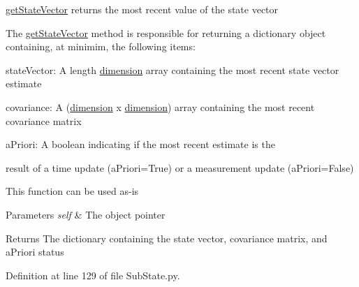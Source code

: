 \hyperlink{classmodest_1_1substates_1_1SubState_1_1SubState_a26146efb15c1d33fee433df4725bae45}{get\+State\+Vector} returns the most recent value of the state vector 

The \hyperlink{classmodest_1_1substates_1_1SubState_1_1SubState_a26146efb15c1d33fee433df4725bae45}{get\+State\+Vector} method is responsible for returning a dictionary object containing, at minimim, the following items\+:


\begin{DoxyItemize}
\item \textquotesingle{}state\+Vector\textquotesingle{}\+: A length \hyperlink{classmodest_1_1substates_1_1SubState_1_1SubState_aaf7473d2ebcd61adf1b7bb2262eb31d1}{dimension} array containing the most recent state vector estimate
\item \textquotesingle{}covariance\textquotesingle{}\+: A (\hyperlink{classmodest_1_1substates_1_1SubState_1_1SubState_aaf7473d2ebcd61adf1b7bb2262eb31d1}{dimension} x \hyperlink{classmodest_1_1substates_1_1SubState_1_1SubState_aaf7473d2ebcd61adf1b7bb2262eb31d1}{dimension}) array containing the most recent covariance matrix
\item \textquotesingle{}a\+Priori\textquotesingle{}\+: A boolean indicating if the most recent estimate is the
\item result of a time update (a\+Priori=True) or a measurement update (a\+Priori=False)
\end{DoxyItemize}

This function can be used as-\/is


\begin{DoxyParams}{Parameters}
{\em self} & The object pointer\\
\hline
\end{DoxyParams}
\begin{DoxyReturn}{Returns}
The dictionary containing the state vector, covariance matrix, and a\+Priori status 
\end{DoxyReturn}


Definition at line 129 of file Sub\+State.\+py.

